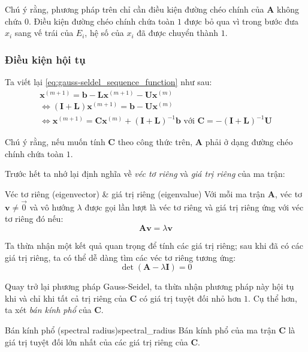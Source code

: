 \documentclass[../../Lectures]{subfiles}
\begin{document}
Chú ý rằng, phương pháp trên chỉ cần điều kiện đường chéo chính của \(\bm{A}\)
không chứa \(0\). Điều kiện đường chéo chính chứa toàn \(1\) được bỏ qua vì
trong bước đưa \(x_i\) sang vế trái của \(E_i\), hệ số của \(x_i\) đã được
chuyển thành \(1\).

\subsubsection{Điều kiện hội tụ}

Ta viết lại \eqref{eq:gauss-seldel_sequence_function} như sau:
\begin{gather*}
    \bm{x}^{(m + 1)} = \bm{b} - \bm{L} \bm{x}^{(m + 1)} - \bm{U} \bm{x}^{(m)} \\
    \iff (\bm{I} + \bm{L})\bm{x}^{(m + 1)} = \bm{b} - \bm{U} \bm{x}^{(m)} \\
    \iff \bm{x}^{(m + 1)} = \bm{C} \bm{x}^{(m)} + (\bm{I} + \bm{L})^{-1} \bm{b} \text{ với } \bm{C} = -(\bm{I} + \bm{L})^{-1} \bm{U}
\end{gather*}

Chú ý rằng, nếu muốn tính \(\bm{C}\) theo công thức trên, \(\bm{A}\) phải ở dạng
đường chéo chính chứa toàn \(1\).

Trước hết ta nhớ lại định nghĩa về \emph{véc tơ riêng} và
\emph{giá trị riêng} của ma trận:

\begin{cdefinition}{Véc tơ riêng (eigenvector) \& giá trị riêng (eigenvalue)}{}
    Với mỗi ma trận \(\bm{A}\), véc tơ \(\bm{v} \neq \vec{0}\) và vô hướng
    \(\lambda\) được gọi lần lượt là véc tơ riêng và giá trị riêng ứng với véc
    tơ riêng đó nếu:
    \[\bm{Av} = \lambda \bm{v}\]
\end{cdefinition}

Ta thừa nhận một kết quả quan trọng để tính các giá trị riêng; sau khi đã có các
giá trị riêng, ta có thể dễ dàng tìm các véc tơ riêng tương ứng:
\[\det(\bm{A} - \lambda \bm{I}) = 0\]

Quay trở lại phương pháp Gauss-Seidel, ta thừa nhận phương pháp này hội tụ khi
và chỉ khi tất cả trị riêng của \(\bm{C}\) có giá trị tuyệt đối nhỏ hơn \(1\).
Cụ thể hơn, ta xét \emph{bán kính phổ} của \(\bm{C}\).

\begin{cdefinition}{Bán kính phổ (spectral radius)}{spectral_radius}
    Bán kính phổ của ma trận \(\bm{C}\) là giá trị tuyệt đối lớn nhất của các
    giá trị riêng của \(\bm{C}\).
\end{cdefinition}
\end{document}
